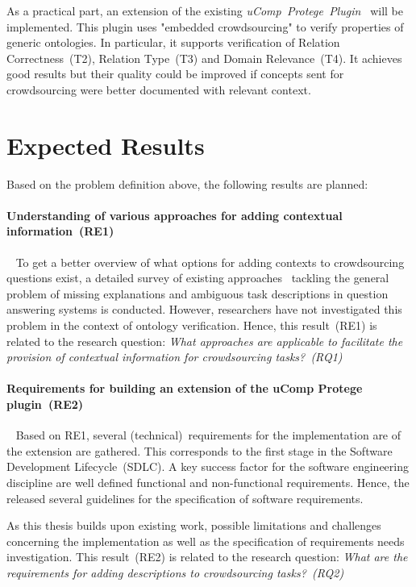 \documentclass[12pt, notitlepage]{article}
\begin{document}
As a practical part, an extension of the existing \emph{uComp~Protege~Plugin~\cite{wohlgenannt2016crowd}} will be implemented. This plugin uses "embedded crowdsourcing" to verify properties of generic ontologies. In particular, it supports verification of Relation Correctness~(T2), Relation Type~(T3) and Domain Relevance~(T4). It achieves good results but their quality could be improved if concepts sent for crowdsourcing were better documented with relevant context. 

\section{Expected Results}
Based on the problem definition above, the following results are planned:
\paragraph{Understanding of various approaches for adding contextual information~(RE1)}~
To get a better overview of what options for adding contexts to crowdsourcing questions exist, a detailed survey of existing approaches~\cite{hoffmann2010context, hoffner2016survey} tackling the general problem of missing explanations and ambiguous task descriptions in question answering systems is conducted. However, researchers have not investigated this problem in the context of ontology verification. Hence, this result~(RE1) is related to the research question: \emph{What approaches are applicable to facilitate the provision of contextual information for crowdsourcing tasks?~(RQ1)}
\paragraph{Requirements for building an extension of the uComp Protege plugin\cite{wohlgenannt2016crowd}~(RE2)}~
Based on RE1, several (technical)~requirements for the implementation are of the extension are gathered. This corresponds to the first stage in the Software Development Lifecycle~(SDLC)\cite{ruparelia2010}. A key success factor for the software engineering discipline are well defined functional and non-functional requirements. Hence, the \citet{ieeeSoftwareRequirements} released several guidelines for the specification of software requirements. 

As this thesis builds upon existing work, possible limitations and challenges concerning the implementation as well as the specification of requirements needs investigation. This result~(RE2) is related to the research question: \emph{What are the requirements for adding descriptions to crowdsourcing tasks?~(RQ2)}
\end{document}
